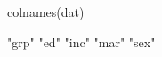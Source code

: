 \begin{Schunk}
\begin{Sinput}
  colnames(dat)
\end{Sinput}
\begin{Soutput}
[1] "grp" "ed"  "inc" "mar" "sex"
\end{Soutput}
\end{Schunk}
